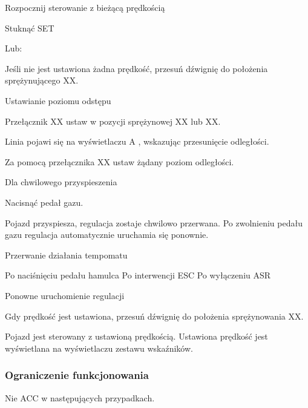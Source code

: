 Rozpocznij sterowanie z bieżącą prędkością

\begin{itemizeArrow}
	\itemArrow Stuknąć SET
\end{itemizeArrow}

Lub:
\begin{itemizeArrow}
	\itemArrow Jeśli nie jest ustawiona żadna prędkość, przesuń dźwignię do położenia sprężynującego XX.
\end{itemizeArrow}

Ustawianie poziomu odstępu

\begin{itemizeArrow}
	\itemArrow Przełącznik XX ustaw w pozycji sprężynowej XX lub XX.
\end{itemizeArrow}


Linia pojawi się na wyświetlaczu A , wskazując przesunięcie odległości.
\begin{itemizeArrow}
	\itemArrow Za pomocą przełącznika XX ustaw żądany poziom odległości.
\end{itemizeArrow}

Dla chwilowego przyspieszenia
\begin{itemizeArrow}
	\itemArrow Nacisnąć pedał gazu.
\end{itemizeArrow}

Pojazd przyspiesza, regulacja zostaje chwilowo przerwana. Po zwolnieniu pedału gazu regulacja automatycznie uruchamia się ponownie.

Przerwanie działania tempomatu
\begin{itemizeTriangle}
	\itemTriangle Po naciśnięciu pedału hamulca
	\itemTriangle Po interwencji ESC
	\itemTriangle Po wyłączeniu ASR
\end{itemizeTriangle}

Ponowne uruchomienie regulacji
\begin{itemizeArrow}
	\itemArrow Gdy prędkość jest ustawiona, przesuń dźwignię do położenia sprężynowania XX.
\end{itemizeArrow}

Pojazd jest sterowany z ustawioną prędkością. Ustawiona prędkość jest wyświetlana na wyświetlaczu zestawu wskaźników.

\subsubsection{Ograniczenie funkcjonowania}

Nie ACC w następujących przypadkach.

